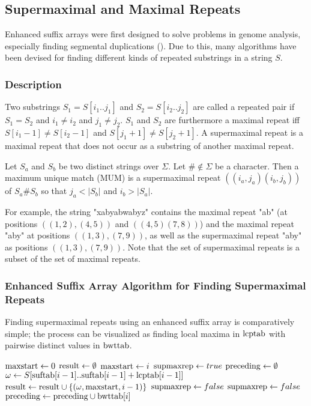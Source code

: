 \documentclass[a4paper,10pt]{article}
\begin{document}
\subsection*{Supermaximal and Maximal Repeats}

Enhanced suffix arrays were first designed to solve problems
in genome analysis, especially finding segmental duplications
(\citealt{lander2001initial}). Due to this, many algorithms have been
devised for finding different kinds of repeated substrings in a string
$S$.

\subsubsection*{Description}

Two substrings $S_1=S[i_1..j_1]$ and $S_2=S[i_2..j_2]$ are called a
repeated pair if $S_1=S_2$ and $i_1 \ne i_2$ and $j_1 \ne j_2$.  $S_1$
and $S_2$ are furthermore a maximal repeat iff $S[i_1-1] \ne S[i_2-1]$
and $S[j_1+1] \ne S[j_2+1]$. A supermaximal repeat is a maximal repeat
that does not occur as a substring of another maximal repeat.

Let $S_a$ and $S_b$ be two distinct strings over $\Sigma$. Let $\#
\not \in \Sigma$ be a character. Then a maximum unique match (MUM) is
a supermaximal repeat $((i_a, j_a)(i_b, j_b))$ of $S_a\#S_b$ so that
$j_a<|S_b|$ and $i_b>|S_a|$.

For example, the string "xabyabwabyz" contains the maximal repeat "ab"
(at positions $((1,2),(4,5))$ and $((4,5)(7,8))$) and the maximal repeat
"aby" at positions $((1,3),(7,9))$, as well as the supermaximal repeat
"aby" as positions $((1,3),(7,9))$. Note that the set of supermaximal
repeats is a subset of the set of maximal repeats.

\subsubsection*{Enhanced Suffix Array Algorithm for Finding Supermaximal Repeats}

Finding supermaximal repeats using an enhanced suffix array is
comparatively simple; the process can be visualized as finding
local maxima in $\hbox{lcptab}$  with pairwise distinct values in
$\hbox{bwttab}$.

\begin{algorithmic}
\State $\hbox{maxstart} \gets 0$
\State $\hbox{result} \gets \emptyset$
		\State $\hbox{maxstart} \gets i$
		\State $\hbox{supmaxrep} \gets true$
		\State $\hbox{preceding} \gets \emptyset$
		\State $\omega \gets S[\hbox{suftab}[i-1]..\hbox{suftab}[i-1] +\hbox{lcptab}[i-1]]$
		\State $\hbox{result} \gets \hbox{result} \cup \{(\omega, \hbox{maxstart}, i-1)\}$
		\State $\hbox{supmaxrep} \gets false$
	\EndIf
		\State $\hbox{supmaxrep} \gets false$
	\Else
		\State $\hbox{preceding} \gets \hbox{preceding} \cup \hbox{bwttab}[i] $
	\EndIf
\EndFor
\end{algorithmic}
\end{document}
